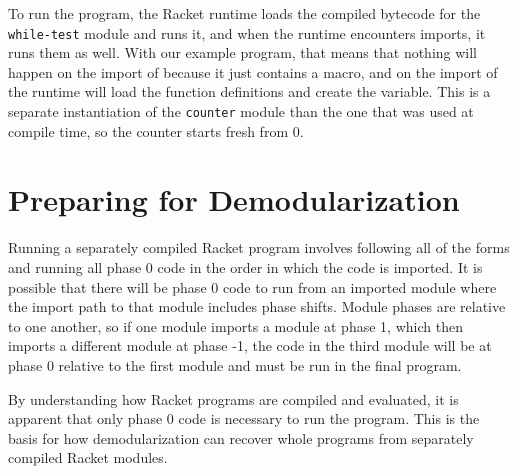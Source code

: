 To run the program, the Racket runtime loads the compiled bytecode for the \texttt{while-test} module and runs it, and when the runtime encounters imports, it runs them as well. 
With our example program, that means that nothing will happen on the import of  because it just contains a macro, and on the import of  the runtime will load the function definitions and create the  variable.
This is a separate instantiation of the \texttt{counter} module than the one that was used at compile time, so the counter starts fresh from 0.



\section{Preparing for Demodularization}

Running a separately compiled Racket program involves following all of the  forms and running all phase 0 code in the order in which the code is imported.
It is possible that there will be phase 0 code to run from an imported module where the import path to that module includes phase shifts.
Module phases are relative to one another, so if one module imports a module at phase 1, which then imports a different module at phase -1, the code in the third module will be at phase 0 relative to the first module and must be run in the final program.

By understanding how Racket programs are compiled and evaluated, it is apparent that only phase 0 code is necessary to run the program. 
This is the basis for how demodularization can recover whole programs from separately compiled Racket modules. 
